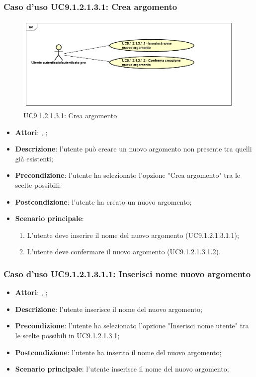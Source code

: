 						\subsubsection{Caso d'uso UC9.1.2.1.3.1: Crea argomento}
						\label{UC9.1.2.1.3.1}
						\begin{figure}[h]
							\centering
						\includegraphics[scale=0.5,keepaspectratio]{UML/UC9_1_2_1_3_1.png}
							\caption{UC9.1.2.1.3.1: Crea argomento}
						\end{figure}
						\FloatBarrier
						\begin{itemize}
							\item \textbf{Attori}: \uau, \uaupro;
							\item \textbf{Descrizione}: l'utente può creare un nuovo argomento non presente tra quelli già esistenti;
							\item \textbf{Precondizione}: l'utente ha selezionato l'opzione "Crea argomento" tra le scelte possibili;
							\item \textbf{Postcondizione}: l'utente ha creato un nuovo argomento; 
							\item \textbf{Scenario principale}:
								\begin{enumerate}
									\item L'utente deve inserire il nome del nuovo argomento (UC9.1.2.1.3.1.1);
									\item L'utente deve confermare il nuovo argomento (UC9.1.2.1.3.1.2).
								\end{enumerate}
						\end{itemize}
						
							\subsubsection{Caso d'uso UC9.1.2.1.3.1.1: Inserisci nome nuovo argomento}
							\label{UC9.1.2.1.3.1.1}
							\begin{itemize}
								\item \textbf{Attori}: \uau, \uaupro;
								\item \textbf{Descrizione}: l'utente inserisce il nome del nuovo argomento;
								\item \textbf{Precondizione}: l'utente ha selezionato l'opzione "Inserisci nome utente" tra le scelte possibili in UC9.1.2.1.3.1;
								\item \textbf{Postcondizione}: l'utente ha inserito il nome del nuovo argomento;
								\item \textbf{Scenario principale}: l'utente inserisce il nome del nuovo argomento;
							\end{itemize}
							
